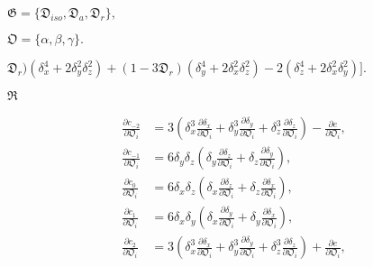 \documentclass[a4paper,11pt,twoside,openright]{book}
\def\lthtmlcheckvsize{\ifdim\ht\sizebox<\vsize 
  \ifdim\wd\sizebox<\hsize\expandafter\hfill\fi \expandafter\vfill
  \else\expandafter\vss\fi}%
\begin{document}
{\newpage\clearpage
{}%
$\displaystyle \mathfrak{G}= \{\mathfrak{D}_{iso}, \mathfrak{D}_a, \mathfrak{D}_r\},$%
\lthtmlindisplaymathZ
\lthtmlcheckvsize\clearpage}

{\newpage\clearpage
{}%
$\displaystyle \mathfrak{O}= \{\alpha, \beta, \gamma\}.$%
\lthtmlindisplaymathZ
\lthtmlcheckvsize\clearpage}

{\newpage\clearpage
{}%
$\displaystyle \mathfrak{D}_r) \left(\delta_x^4 + 2\delta_y^2\delta_z^2\right)
+ (1 - 3\mathfrak{D}_r) \left(\delta_y^4 + 2\delta_x^2\delta_z^2\right) - 2 \left(\delta_z^4 + 2\delta_x^2\delta_y^2\right) \bigg].$%
\lthtmlindisplaymathZ
\lthtmlcheckvsize\clearpage}

{\newpage\clearpage
{}%
$ \mathfrak{R}$%
\lthtmlindisplaymathZ
\lthtmlcheckvsize\clearpage}

{\newpage\clearpage
\setcounter{equation}{117}
%
\begin{subequations}\begin{align}
\frac{\partial c_{-2}}{\partial \mathfrak{O}_i} &= 3 \left( \delta_x^3 \frac{\partial \delta_x}{\partial \mathfrak{O}_i}  +  \delta_y^3 \frac{\partial \delta_y}{\partial \mathfrak{O}_i}  +  \delta_z^3 \frac{\partial \delta_z}{\partial \mathfrak{O}_i} \right) - \frac{\partial e}{\partial \mathfrak{O}_i}, \\
\frac{\partial c_{-1}}{\partial \mathfrak{O}_i} &= 6 \delta_y \delta_z \left( \delta_y \frac{\partial \delta_z}{\partial \mathfrak{O}_i}  +  \delta_z \frac{\partial \delta_y}{\partial \mathfrak{O}_i} \right), \\
\frac{\partial c_{0}}{\partial \mathfrak{O}_i}  &= 6 \delta_x \delta_z \left( \delta_x \frac{\partial \delta_z}{\partial \mathfrak{O}_i}  +  \delta_z \frac{\partial \delta_x}{\partial \mathfrak{O}_i} \right), \\
\frac{\partial c_{1}}{\partial \mathfrak{O}_i}  &= 6 \delta_x \delta_y \left( \delta_x \frac{\partial \delta_y}{\partial \mathfrak{O}_i}  +  \delta_y \frac{\partial \delta_x}{\partial \mathfrak{O}_i} \right), \\
\frac{\partial c_{2}}{\partial \mathfrak{O}_i}  &= 3 \left( \delta_x^3 \frac{\partial \delta_x}{\partial \mathfrak{O}_i}  +  \delta_y^3 \frac{\partial \delta_y}{\partial \mathfrak{O}_i}  +  \delta_z^3 \frac{\partial \delta_z}{\partial \mathfrak{O}_i} \right) + \frac{\partial e}{\partial \mathfrak{O}_i},
\end{align}\end{subequations}%
\lthtmldisplayZ
\lthtmlcheckvsize\clearpage}
\end{document}
